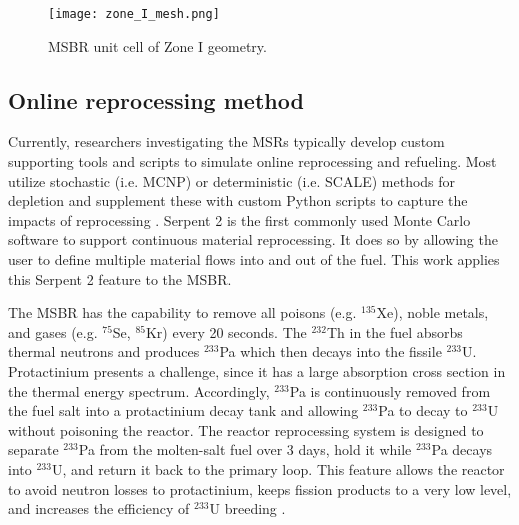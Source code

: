 \documentclass{anstrans}
\begin{document}
\begin{figure}[htbp!] %
        \centering
        \texttt{[image: zone\_I\_mesh.png]}
        \caption{MSBR unit cell of Zone I geometry.}
        \label{fig:zoneI}
\end{figure}

\FloatBarrier
\subsection{Online reprocessing method}

Currently, researchers 
investigating the \glspl{MSR} 
typically develop custom supporting tools and scripts to simulate 
online reprocessing and refueling. Most utilize stochastic (i.e. 
\gls{MCNP}) or deterministic (i.e. SCALE) methods for depletion and supplement 
these with custom Python scripts to capture the impacts of reprocessing 
\cite{jeong_equilibrium_2016,park_whole_2015}. Serpent 2 is the 
first commonly used Monte Carlo software to support continuous material 
reprocessing. It does so by allowing the user to 
define multiple material flows into and out of the fuel. This work applies this 
Serpent 2 feature to the \gls{MSBR}. 

The \gls{MSBR} has the capability to remove all poisons
(e.g. 
$^{135}$Xe), noble metals, and gases (e.g. $^{75}$Se, $^{85}$Kr) 
every 20 seconds. The $^{232}$Th in the fuel absorbs thermal 
neutrons and produces $^{233}$Pa which then decays into the fissile $^{233}$U. 
Protactinium presents a challenge, since it has a large absorption cross section in the thermal 
energy spectrum. Accordingly, $^{233}$Pa is continuously removed from the fuel salt 
into a protactinium decay tank and allowing $^{233}$Pa to decay to $^{233}$U without 
poisoning the reactor. The reactor reprocessing system is designed to separate 
$^{233}$Pa from the molten-salt fuel over 3 days, hold it while $^{233}$Pa 
decays into $^{233}$U, and return it back to the primary loop. This feature allows the reactor to 
avoid neutron losses to protactinium, keeps fission products to a very low level, and 
increases the efficiency of $^{233}$U breeding \cite{robertson_conceptual_1971}.
\end{document}
